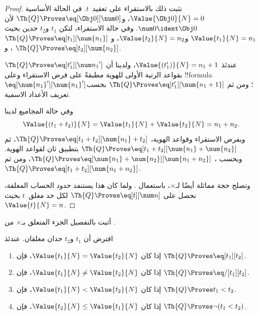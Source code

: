 \documentclass[../../../include/open-logic-section]{subfiles}
\begin{document}
\begin{proof}
نثبت ذلك بالاستقراء على تعقيد~$t$. في الحالة الأساسية
$\Value{\Obj 0}{N}=0$، و$\Th{Q}\Proves\eq[\Obj 0][\num 0]$ لأن
$\num 0\ident\Obj 0$.
%
وفي حالة الاستقراء، لتكن $t_1$ و$t_2$ حدين بحيث
$\Value{t_1}{N}=n_1$ و$\Value{t_2}{N}=n_2$، و
$\Th{Q}\Proves\eq[t_1][\num{n_1}]$، و
$\Th{Q}\Proves\eq[t_2][\num{n_2}]$.

عندئذ $\Value{(t_1')}{N}=n_1+1$، ولدينا أن
$\Th{Q}\Proves\eq[t_1'][{\num n_1}']$ بقواعد الرتبة الأولى
للهوية مطبقةً على فرض الاستقراء وعلى !!{formula}
$\eq[\num{n_1}'][\num{n_1}']$؛ ومن ثم
$\Th{Q}\Proves\eq[t_1'][\num{n_1+1}]$ بحسب تعريف الأعداد الاسمية.

وفي حالة المجاميع لدينا
\[
      \Value{(t_1 + t_2)}{N}
    = \Value{t_1}{N} + \Value{t_2}{N}
    = n_1 + n_2.
\]
وبفرض الاستقراء وقواعد الهوية،
$\Th{Q}\Proves\eq[t_1+t_2][\num{n_1}+t_2]$، ثم
$\Th{Q}\Proves\eq[t_1+t_2][\num{n_1}+\num{n_2}]$
بتطبيق ثان لقواعد الهوية. وبحسب
،
$\Th{Q}\Proves
\eq[\num{n_1}+\num{n_2}][\num{n_1+n_2}]$، ومن ثم
$\Th{Q}\Proves\eq[t_1+t_2][\num{n_1+n_2}]$.

وتصلح حجة مماثلة أيضًا لـ$\times$، باستعمال
.
%
ولما كان هذا يستنفد حدود الحساب المغلقة، نحصل على
$\Th{Q}\Proves\eq[t][\num n]$ لكل حد مغلق~$t$ بحيث
$\Value{t}{N}=n$.
\end{proof}

\begin{prob}
أثبت بالتفصيل الجزء المتعلق بـ$\times$ من
.
\end{prob}

\begin{lem}
افترض أن $t_1$ و$t_2$ حدان مغلقان. عندئذ
\begin{enumerate}
\item إذا كان $\Value{t_1}{N}=\Value{t_2}{N}$،
    فإن $\Th{Q}\Proves\eq[t_1][t_2]$.
\item إذا كان $\Value{t_1}{N}\neq\Value{t_2}{N}$،
    فإن $\Th{Q}\Proves\eq/[t_1][t_2]$.
\item إذا كان $\Value{t_1}{N}<\Value{t_2}{N}$،
    فإن $\Th{Q}\Proves t_1<t_2$.
\item إذا كان $\Value{t_2}{N}\leq\Value{t_1}{N}$،
    فإن $\Th{Q}\Proves\lnot(t_1<t_2)$.
\end{enumerate}
\end{lem}
\end{document}
